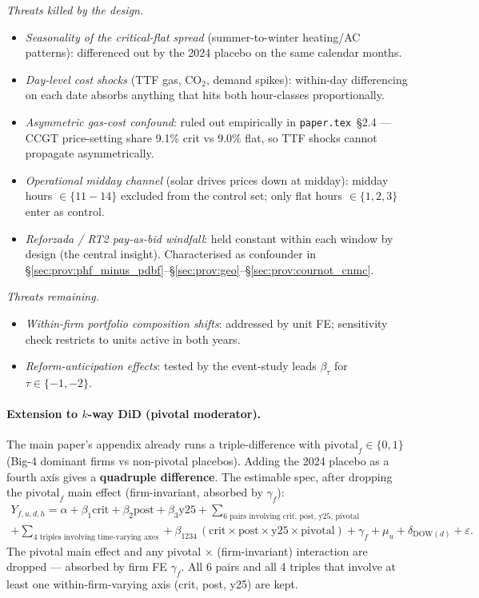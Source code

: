 \documentclass[11pt,a4paper]{article}
\begin{document}
\textit{Threats killed by the design.}
\begin{itemize}
   \item \emph{Seasonality of the critical-flat spread} (summer-to-winter heating/AC patterns): differenced out by the 2024 placebo on the same calendar months.
   \item \emph{Day-level cost shocks} (TTF gas, CO$_2$, demand spikes): within-day differencing on each date absorbs anything that hits both hour-classes proportionally.
   \item \emph{Asymmetric gas-cost confound}: ruled out empirically in \texttt{paper.tex}~§2.4 --- CCGT price-setting share 9.1\% crit vs 9.0\% flat, so TTF shocks cannot propagate asymmetrically.
   \item \emph{Operational midday channel} (solar drives prices down at midday): midday hours $\in \{11\!-\!14\}$ excluded from the control set; only flat hours $\in \{1,2,3\}$ enter as control.
   \item \emph{Reforzada / RT2 pay-as-bid windfall}: held constant within each window by design (the central insight). Characterised as confounder in \S\ref{sec:prov:phf_minus_pdbf}--\S\ref{sec:prov:geo}--\S\ref{sec:prov:cournot_cnmc}.
\end{itemize}

\textit{Threats remaining.}
\begin{itemize}
   \item \emph{Within-firm portfolio composition shifts}: addressed by unit FE; sensitivity check restricts to units active in both years.
   \item \emph{Reform-anticipation effects}: tested by the event-study leads $\beta_\tau$ for $\tau \in \{-1, -2\}$.
\end{itemize}

\paragraph{Extension to $k$-way DiD (pivotal moderator).} The main paper's appendix already runs a triple-difference with $\text{pivotal}_f \in \{0, 1\}$ (Big-4 dominant firms vs non-pivotal placebos). Adding the 2024 placebo as a fourth axis gives a \textbf{quadruple difference}. The estimable spec, after dropping the $\text{pivotal}_f$ main effect (firm-invariant, absorbed by $\gamma_f$):
\begin{multline}
  Y_{f,u,d,h} = \alpha + \beta_1 \text{crit} + \beta_2 \text{post} + \beta_3 \text{y25}
    + \sum_{\text{6 pairs involving } \text{crit, post, y25, pivotal}} \\
    + \sum_{\text{4 triples involving time-varying axes}}
    + \boxed{\beta_{1234}\,(\text{crit} \times \text{post} \times \text{y25} \times \text{pivotal})}
    + \gamma_f + \mu_u + \delta_{\text{DOW}(d)} + \varepsilon.
\end{multline}
The pivotal main effect and any pivotal $\times$ (firm-invariant) interaction are dropped — absorbed by firm FE $\gamma_f$. All 6 pairs and all 4 triples that involve at least one within-firm-varying axis (crit, post, y25) are kept.
\end{document}
